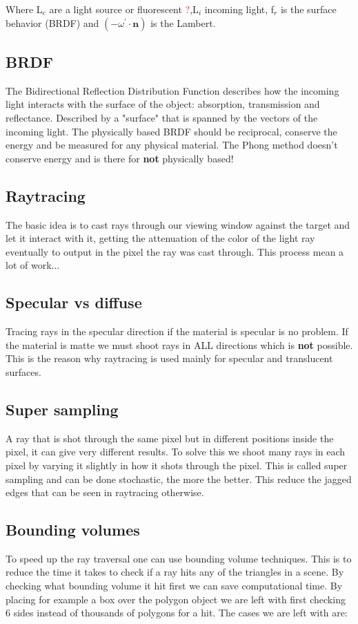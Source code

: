 Where L$_e$ are a light source or fluorescent \textcolor{red}{?},L$_i$ incoming light,  f$_r$ is the surface behavior (BRDF) and $(-\omega^{\prime} \cdot \textbf{n})$ is the Lambert.

\subsection*{BRDF}
The Bidirectional Reflection Distribution Function describes how the incoming light interacts with the surface of the object: absorption, transmission and reflectance. Described by a "surface"
that is spanned by the vectors of the incoming light. The physically based BRDF should be reciprocal, conserve the energy and be measured for any physical material. The Phong method doesn't conserve energy and is there for \textbf{not} physically based!

\subsection*{Raytracing}
The basic idea is to cast rays through our viewing window against the target and let it interact with it, getting the attenuation of the color of the light ray eventually to output in the pixel the ray was cast through. This process mean a lot of work...


\subsection*{Specular vs diffuse}
Tracing rays in the specular direction if the material is specular is no problem. If the material is matte we must shoot rays in ALL directions which is \textbf{not} possible. This is the reason why raytracing is used mainly for specular and translucent surfaces. 

\subsection*{Super sampling}
A ray that is shot through the same pixel but in different positions inside the pixel, it can give very different results. To solve this we shoot many rays in each pixel by varying it slightly in how it shots through the pixel. This is called super sampling and can be done stochastic, the more the better. This reduce the jagged edges that can be seen in raytracing otherwise. 

\subsection*{Bounding volumes}
To speed up the ray traversal one can use bounding volume techniques. This is to reduce the time it takes to check if a ray hits any of the triangles in a scene. By checking what bounding volume it hit first we can save computational time. By placing for example a box over the polygon object we are left with first checking 6 sides instead of thousands of polygons for a hit. The cases we are left with are:

